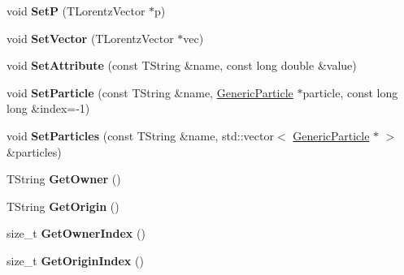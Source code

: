 \begin{DoxyCompactItemize}
\item 
\hypertarget{class_h_a_l_1_1_generic_particle_a985b92b525a1b6c2199b3c797dae153d}{void {\bfseries Set\+P} (T\+Lorentz\+Vector $\ast$p)}\label{class_h_a_l_1_1_generic_particle_a985b92b525a1b6c2199b3c797dae153d}

\item 
\hypertarget{class_h_a_l_1_1_generic_particle_a29a1b6d060a5bd6d4a2d5b638629016e}{void {\bfseries Set\+Vector} (T\+Lorentz\+Vector $\ast$vec)}\label{class_h_a_l_1_1_generic_particle_a29a1b6d060a5bd6d4a2d5b638629016e}

\item 
\hypertarget{class_h_a_l_1_1_generic_particle_aacce9b75bb12d4a0b2ad69d9784527d9}{void {\bfseries Set\+Attribute} (const T\+String \&name, const long double \&value)}\label{class_h_a_l_1_1_generic_particle_aacce9b75bb12d4a0b2ad69d9784527d9}

\item 
\hypertarget{class_h_a_l_1_1_generic_particle_a779773d398f0555bfe65295e16494156}{void {\bfseries Set\+Particle} (const T\+String \&name, \hyperlink{class_h_a_l_1_1_generic_particle}{Generic\+Particle} $\ast$particle, const long long \&index=-\/1)}\label{class_h_a_l_1_1_generic_particle_a779773d398f0555bfe65295e16494156}

\item 
\hypertarget{class_h_a_l_1_1_generic_particle_aa30c8bf16ffb744999e05e062b647c45}{void {\bfseries Set\+Particles} (const T\+String \&name, std\+::vector$<$ \hyperlink{class_h_a_l_1_1_generic_particle}{Generic\+Particle} $\ast$ $>$ \&particles)}\label{class_h_a_l_1_1_generic_particle_aa30c8bf16ffb744999e05e062b647c45}

\item 
\hypertarget{class_h_a_l_1_1_generic_particle_a1eb591edadc5dff045b70d4a4aedba2e}{T\+String {\bfseries Get\+Owner} ()}\label{class_h_a_l_1_1_generic_particle_a1eb591edadc5dff045b70d4a4aedba2e}

\item 
\hypertarget{class_h_a_l_1_1_generic_particle_a712c5e92caba83c8c1f0566d860d6a1e}{T\+String {\bfseries Get\+Origin} ()}\label{class_h_a_l_1_1_generic_particle_a712c5e92caba83c8c1f0566d860d6a1e}

\item 
\hypertarget{class_h_a_l_1_1_generic_particle_a971d9c0b255cb94b70ea29907842af71}{size\+\_\+t {\bfseries Get\+Owner\+Index} ()}\label{class_h_a_l_1_1_generic_particle_a971d9c0b255cb94b70ea29907842af71}

\item 
\hypertarget{class_h_a_l_1_1_generic_particle_a6b38ac523f31d45da86d153913a25643}{size\+\_\+t {\bfseries Get\+Origin\+Index} ()}\label{class_h_a_l_1_1_generic_particle_a6b38ac523f31d45da86d153913a25643}


\end{DoxyCompactItemize}
